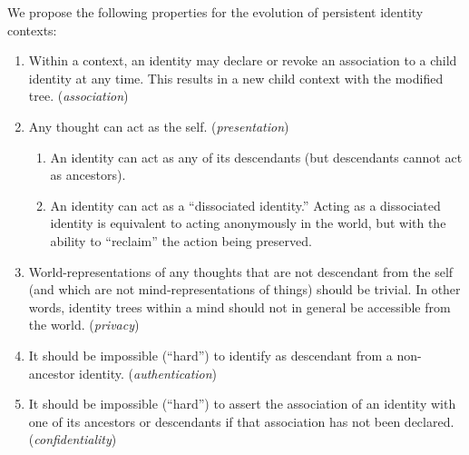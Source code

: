 \documentclass[pra,twocolumn,groupedaddress,10pt]{revtex4}
\theoremstyle{definition}
\begin{document}
We propose the following properties for the evolution of persistent identity contexts:

\begin{enumerate}

\item Within a context, an identity may declare or revoke an association to a child identity at any time. This results in a new child context with the modified tree. (\emph{association})

\item Any thought can act as the self. (\emph{presentation})
	\begin{enumerate}
		\item An identity can act as any of its descendants (but descendants cannot act as ancestors).
		\item An identity can act as a ``dissociated identity.'' Acting as a dissociated identity is equivalent to acting anonymously in the world, but with the ability to ``reclaim'' the action being preserved.
	\end{enumerate}

\item World-representations of any thoughts that are not descendant from the self (and which are not mind-representations of things) should be trivial. In other words, identity trees within a mind should not in general be accessible from the world. (\emph{privacy})

\item It should be impossible (``hard'') to identify as descendant from a non-ancestor identity. (\emph{authentication})

\item It should be impossible (``hard'') to assert the association of an identity with one of its ancestors or descendants if that association has not been declared. (\emph{confidentiality})

\end{enumerate}
\end{document}
